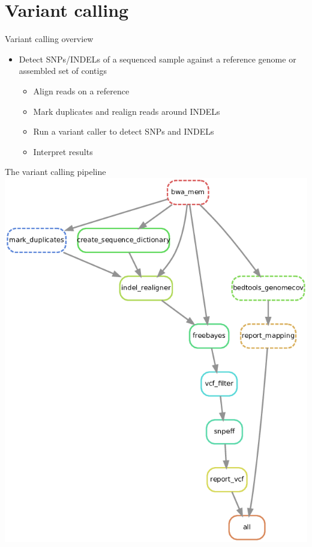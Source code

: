 \documentclass{beamer}
\begin{document}
\section{Variant calling}

\begin{frame}{Variant calling overview}
    \begin{itemize}
        \item Detect SNPs/INDELs of a sequenced sample against a reference genome 
            or assembled set of contigs
        \begin{itemize}
            \item Align reads on a reference
            \item Mark duplicates and realign reads around INDELs
            \item Run a variant caller to detect SNPs and INDELs
            \item Interpret results
        \end{itemize}
    \end{itemize}
\end{frame}

\begin{frame}{The variant calling pipeline}
    \center
    \includegraphics[scale=0.28]{images/variant_calling_dag}
\end{frame}
\end{document}
